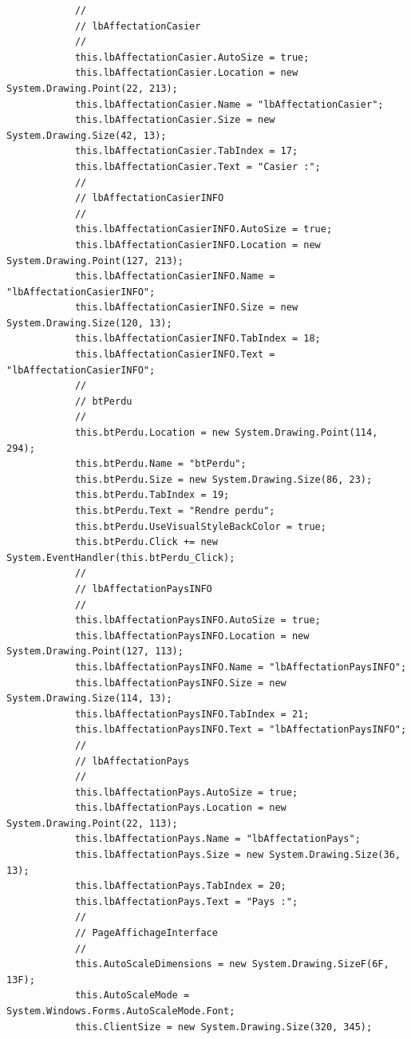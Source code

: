 \documentclass[main.tex]{subfiles}
\begin{document}
\begin{lstlisting}
            // 
            // lbAffectationCasier
            // 
            this.lbAffectationCasier.AutoSize = true;
            this.lbAffectationCasier.Location = new System.Drawing.Point(22, 213);
            this.lbAffectationCasier.Name = "lbAffectationCasier";
            this.lbAffectationCasier.Size = new System.Drawing.Size(42, 13);
            this.lbAffectationCasier.TabIndex = 17;
            this.lbAffectationCasier.Text = "Casier :";
            // 
            // lbAffectationCasierINFO
            // 
            this.lbAffectationCasierINFO.AutoSize = true;
            this.lbAffectationCasierINFO.Location = new System.Drawing.Point(127, 213);
            this.lbAffectationCasierINFO.Name = "lbAffectationCasierINFO";
            this.lbAffectationCasierINFO.Size = new System.Drawing.Size(120, 13);
            this.lbAffectationCasierINFO.TabIndex = 18;
            this.lbAffectationCasierINFO.Text = "lbAffectationCasierINFO";
            // 
            // btPerdu
            // 
            this.btPerdu.Location = new System.Drawing.Point(114, 294);
            this.btPerdu.Name = "btPerdu";
            this.btPerdu.Size = new System.Drawing.Size(86, 23);
            this.btPerdu.TabIndex = 19;
            this.btPerdu.Text = "Rendre perdu";
            this.btPerdu.UseVisualStyleBackColor = true;
            this.btPerdu.Click += new System.EventHandler(this.btPerdu_Click);
            // 
            // lbAffectationPaysINFO
            // 
            this.lbAffectationPaysINFO.AutoSize = true;
            this.lbAffectationPaysINFO.Location = new System.Drawing.Point(127, 113);
            this.lbAffectationPaysINFO.Name = "lbAffectationPaysINFO";
            this.lbAffectationPaysINFO.Size = new System.Drawing.Size(114, 13);
            this.lbAffectationPaysINFO.TabIndex = 21;
            this.lbAffectationPaysINFO.Text = "lbAffectationPaysINFO";
            // 
            // lbAffectationPays
            // 
            this.lbAffectationPays.AutoSize = true;
            this.lbAffectationPays.Location = new System.Drawing.Point(22, 113);
            this.lbAffectationPays.Name = "lbAffectationPays";
            this.lbAffectationPays.Size = new System.Drawing.Size(36, 13);
            this.lbAffectationPays.TabIndex = 20;
            this.lbAffectationPays.Text = "Pays :";
            // 
            // PageAffichageInterface
            // 
            this.AutoScaleDimensions = new System.Drawing.SizeF(6F, 13F);
            this.AutoScaleMode = System.Windows.Forms.AutoScaleMode.Font;
            this.ClientSize = new System.Drawing.Size(320, 345);

\end{lstlisting}
\end{document}
